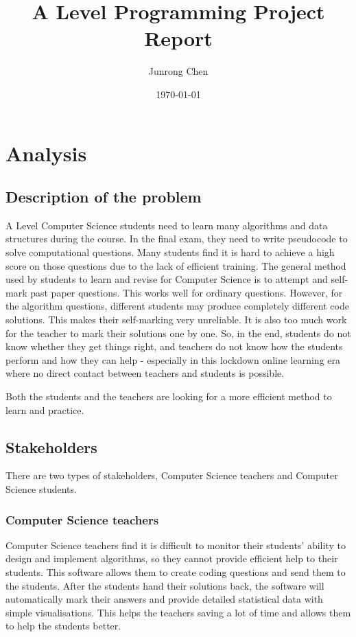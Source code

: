 \documentclass[a4paper]{report}
\title{A Level Programming Project Report}
\author{Junrong Chen}
\date{\today}
\begin{document}
\maketitle
\tableofcontents
\clearpage
\chapter{Analysis}

\section{Description of the problem}

A Level Computer Science students need to learn many algorithms and data structures during the course. In the final exam, they need to write pseudocode to solve computational questions. Many students find it is hard to achieve a high score on those questions due to the lack of efficient training. The general method used by students to learn and revise for Computer Science is to attempt and self-mark past paper questions. This works well for ordinary questions. However, for the algorithm questions, different students may produce completely different code solutions. This makes their self-marking very unreliable. It is also too much work for the teacher to mark their solutions one by one. So, in the end, students do not know whether they get things right, and teachers do not know how the students perform and how they can help - especially in this lockdown online learning era where no direct contact between teachers and students is possible.

Both the students and the teachers are looking for a more efficient method to learn and practice.

\section{Stakeholders}

There are two types of stakeholders, Computer Science teachers and Computer Science students.

\subsection{Computer Science teachers}

Computer Science teachers find it is difficult to monitor their students' ability to design and implement algorithms, so they cannot provide efficient help to their students. This software allows them to create coding questions and send them to the students. After the students hand their solutions back, the software will automatically mark their answers and provide detailed statistical data with simple visualisations. This helps the teachers saving a lot of time and allows them to help the students better.
\end{document}
